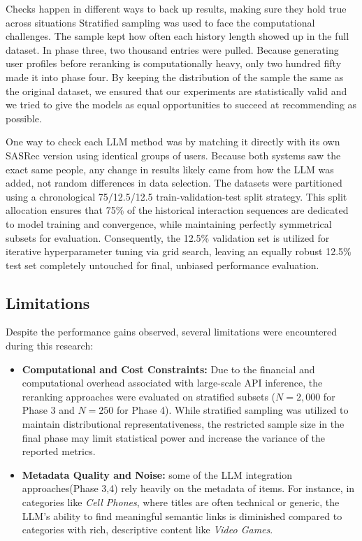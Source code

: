 \documentclass[conference]{IEEEtran}
\begin{document}
Checks happen in different ways to back up results, making sure they hold true across situations
Stratified sampling was used to face the computational challenges. The sample kept how often each history length showed up in the full dataset. In phase three, two thousand entries were pulled. Because generating user profiles before reranking is computationally heavy, only two hundred fifty made it into phase four. By keeping the distribution of the sample the same as the original dataset, we ensured that our experiments are statistically valid and we tried to give the models as equal opportunities to succeed at recommending as possible. 

One way to check each LLM method was by matching it directly with its own SASRec version using identical groups of users. Because both systems saw the exact same people, any change in results likely came from how the LLM was added, not random differences in data selection.
The datasets were partitioned using a chronological 75/12.5/12.5 train-validation-test split strategy. This split allocation ensures that 75\% of the historical interaction sequences are dedicated to model training and convergence, while maintaining perfectly symmetrical subsets for evaluation. Consequently, the 12.5\% validation set is utilized for iterative hyperparameter tuning via grid search, leaving an equally robust 12.5\% test set completely untouched for final, unbiased performance evaluation.

\subsection{Limitations}

Despite the performance gains observed, several limitations were encountered during this research:

\begin{itemize}
    \item \textbf{Computational and Cost Constraints:} Due to the financial and computational overhead associated with large-scale API inference, the reranking approaches were evaluated on stratified subsets ($N=2,000$ for Phase 3 and $N=250$ for Phase 4). While stratified sampling was utilized to maintain distributional representativeness, the restricted sample size in the final phase may limit statistical power and increase the variance of the reported metrics.
    \item \textbf{Metadata Quality and Noise:} some of the LLM integration approaches(Phase 3,4) rely heavily on the metadata of items. For instance, in categories like \textit{Cell Phones}, where titles are often technical or generic, the LLM’s ability to find meaningful semantic links is diminished compared to categories with rich, descriptive content like \textit{Video Games}.
\end{itemize}
\end{document}
